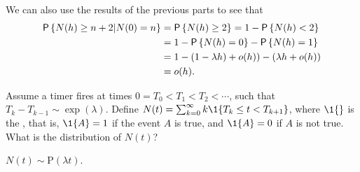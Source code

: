 \begin{question}
\begin{solution}
\begin{enumerate}
We can also use the results of the previous parts to see that
\begin{equation*}
    \begin{split}
  \P{N(h) \geq n+2 | N(0) = n} 
&= \P{N(h) \geq 2} = 1- \P{N(h)<2} \\
&= 1 - \P{N(h)= 0} - \P{N(h)=1} \\
&= 1 - (1-\lambda h) + o(h) ) - (\lambda h + o(h)) \\
&= o(h).
\end{split}  
\end{equation*}
\end{enumerate}
\end{solution}
\end{question}


\begin{question}
  Assume a timer fires at times $0=T_0<T_1<T_2< \cdots$, such that
  $T_{k}-T_{k-1}\sim\exp(\lambda)$. Define
  $N(t) = \sum_{k=0}^\infty k \1{T_k \leq t < T_{k+1}}$, where $\1{}$
  is the , that is, $\1{A}=1$ if the event
  $A$ is true, and $\1{A}=0$ if $A$ is not true. What is the
  distribution of $N(t)$?
\begin{solution}
$N(t) \sim \text{P}(\lambda t)$. 
\end{solution}
\end{question}

